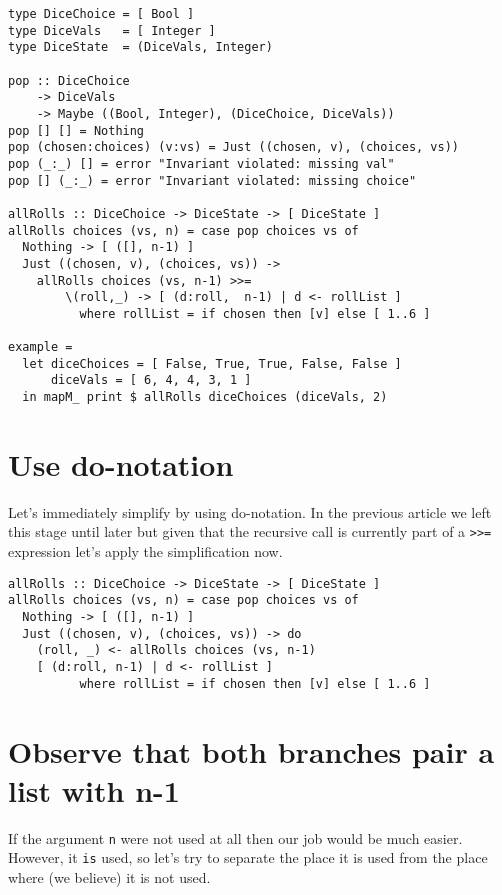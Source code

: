 \begin{verbatim}
type DiceChoice = [ Bool ]
type DiceVals   = [ Integer ]
type DiceState  = (DiceVals, Integer)

pop :: DiceChoice
    -> DiceVals
    -> Maybe ((Bool, Integer), (DiceChoice, DiceVals))
pop [] [] = Nothing
pop (chosen:choices) (v:vs) = Just ((chosen, v), (choices, vs))
pop (_:_) [] = error "Invariant violated: missing val"
pop [] (_:_) = error "Invariant violated: missing choice"

allRolls :: DiceChoice -> DiceState -> [ DiceState ]
allRolls choices (vs, n) = case pop choices vs of
  Nothing -> [ ([], n-1) ]
  Just ((chosen, v), (choices, vs)) ->
    allRolls choices (vs, n-1) >>=
        \(roll,_) -> [ (d:roll,  n-1) | d <- rollList ]
          where rollList = if chosen then [v] else [ 1..6 ]

example =
  let diceChoices = [ False, True, True, False, False ]
      diceVals = [ 6, 4, 4, 3, 1 ]
  in mapM_ print $ allRolls diceChoices (diceVals, 2)
\end{verbatim}

\section{Use do-notation}


Let's immediately simplify by using do-notation. In the previous article we left this stage until later but given that the recursive call is currently part of a \texttt{>>=} expression let's apply the simplification now.

\begin{verbatim}
allRolls :: DiceChoice -> DiceState -> [ DiceState ]
allRolls choices (vs, n) = case pop choices vs of
  Nothing -> [ ([], n-1) ]
  Just ((chosen, v), (choices, vs)) -> do
    (roll, _) <- allRolls choices (vs, n-1)
    [ (d:roll, n-1) | d <- rollList ]
          where rollList = if chosen then [v] else [ 1..6 ]
\end{verbatim}


\section{Observe that both branches pair a list with n-1}


If the argument \texttt{n} were not used at all then our job would be much easier. However, it \texttt{is} used, so let's try to separate the place it is used from the place where (we believe) it is not used.

